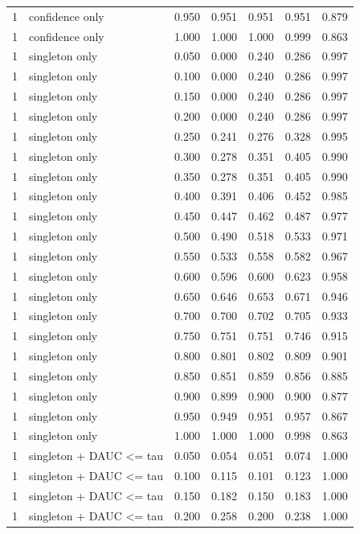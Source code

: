 \begin{tabular}{rlrrrrr}
1 & confidence only & 0.950 & 0.951 & 0.951 & 0.951 & 0.879 \\
1 & confidence only & 1.000 & 1.000 & 1.000 & 0.999 & 0.863 \\
1 & singleton only & 0.050 & 0.000 & 0.240 & 0.286 & 0.997 \\
1 & singleton only & 0.100 & 0.000 & 0.240 & 0.286 & 0.997 \\
1 & singleton only & 0.150 & 0.000 & 0.240 & 0.286 & 0.997 \\
1 & singleton only & 0.200 & 0.000 & 0.240 & 0.286 & 0.997 \\
1 & singleton only & 0.250 & 0.241 & 0.276 & 0.328 & 0.995 \\
1 & singleton only & 0.300 & 0.278 & 0.351 & 0.405 & 0.990 \\
1 & singleton only & 0.350 & 0.278 & 0.351 & 0.405 & 0.990 \\
1 & singleton only & 0.400 & 0.391 & 0.406 & 0.452 & 0.985 \\
1 & singleton only & 0.450 & 0.447 & 0.462 & 0.487 & 0.977 \\
1 & singleton only & 0.500 & 0.490 & 0.518 & 0.533 & 0.971 \\
1 & singleton only & 0.550 & 0.533 & 0.558 & 0.582 & 0.967 \\
1 & singleton only & 0.600 & 0.596 & 0.600 & 0.623 & 0.958 \\
1 & singleton only & 0.650 & 0.646 & 0.653 & 0.671 & 0.946 \\
1 & singleton only & 0.700 & 0.700 & 0.702 & 0.705 & 0.933 \\
1 & singleton only & 0.750 & 0.751 & 0.751 & 0.746 & 0.915 \\
1 & singleton only & 0.800 & 0.801 & 0.802 & 0.809 & 0.901 \\
1 & singleton only & 0.850 & 0.851 & 0.859 & 0.856 & 0.885 \\
1 & singleton only & 0.900 & 0.899 & 0.900 & 0.900 & 0.877 \\
1 & singleton only & 0.950 & 0.949 & 0.951 & 0.957 & 0.867 \\
1 & singleton only & 1.000 & 1.000 & 1.000 & 0.998 & 0.863 \\
1 & singleton + DAUC <= tau & 0.050 & 0.054 & 0.051 & 0.074 & 1.000 \\
1 & singleton + DAUC <= tau & 0.100 & 0.115 & 0.101 & 0.123 & 1.000 \\
1 & singleton + DAUC <= tau & 0.150 & 0.182 & 0.150 & 0.183 & 1.000 \\
1 & singleton + DAUC <= tau & 0.200 & 0.258 & 0.200 & 0.238 & 1.000 \\

\end{tabular}
